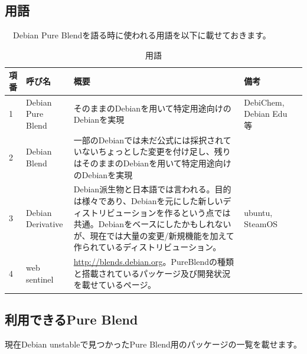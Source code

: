 \documentclass[mingoth,a4paper]{jsarticle}
\begin{document}
\subsection{用語}

　Debian Pure Blendを語る時に使われる用語を以下に載せておきます\cite{debian-pure-blends-wiki}。

\begin{table}[ht]
\begin{center}
\begin{tabular}{|l|l|p{9cm}|p{3cm}|l|}
\hline 
項番&呼び名&概要&備考 \\ \hline \hline
1 & Debian Pure Blend & そのままのDebianを用いて特定用途向けのDebianを実現 & DebiChem, Debian Edu等 \\ \hline
2 & Debian Blend & 一部のDebianでは未だ公式には採択されていないちょっとした変更を付け足し、残りはそのままのDebianを用いて特定用途向けのDebianを実現 & \\ \hline
3 & Debian Derivative & Debian派生物と日本語では言われる。目的は様々であり、Debianを元にした新しいディストリビューションを作るという点では共通。Debianをベースにしたかもしれないが、現在では大量の変更/新規機能を加えて作られているディストリビューション。& ubuntu, SteamOS　\\ \hline
4 & web sentinel & \url{http://blends.debian.org}。PureBlendの種類と搭載されているパッケージ及び開発状況を載せているページ。 & \\ \hline
\end{tabular}
\label{tab:debian-blends-terms}
\caption{用語}
\end{center}
\end{table}

\subsection{利用できるPure Blend}

 現在Debian unstableで見つかったPure Blend用のパッケージの一覧を載せます。
\end{document}

